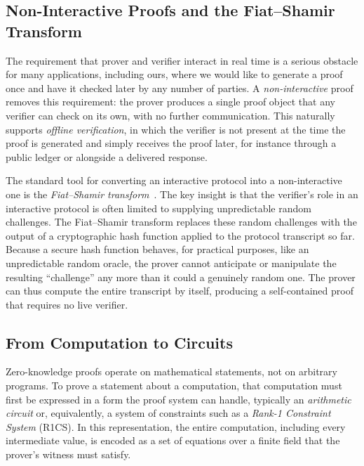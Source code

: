 \subsection{Non-Interactive Proofs and the Fiat--Shamir Transform}
\label{subsec:bg-noninteractive}

The requirement that prover and verifier interact in real time is a serious obstacle for many applications, including ours, where we would like to generate a proof once and have it checked later by any number of parties. A \emph{non-interactive} proof removes this requirement: the prover produces a single proof object that any verifier can check on its own, with no further communication. This naturally supports \emph{offline verification}, in which the verifier is not present at the time the proof is generated and simply receives the proof later, for instance through a public ledger or alongside a delivered response.

\medskip

The standard tool for converting an interactive protocol into a non-interactive one is the \emph{Fiat--Shamir transform}~\cite{fiat1986how}. The key insight is that the verifier's role in an interactive protocol is often limited to supplying unpredictable random challenges. The Fiat--Shamir transform replaces these random challenges with the output of a cryptographic hash function applied to the protocol transcript so far. Because a secure hash function behaves, for practical purposes, like an unpredictable random oracle, the prover cannot anticipate or manipulate the resulting ``challenge'' any more than it could a genuinely random one. The prover can thus compute the entire transcript by itself, producing a self-contained proof that requires no live verifier.

\subsection{From Computation to Circuits}
\label{subsec:bg-circuits}

Zero-knowledge proofs operate on mathematical statements, not on arbitrary programs. To prove a statement about a computation, that computation must first be expressed in a form the proof system can handle, typically an \emph{arithmetic circuit} or, equivalently, a system of constraints such as a \emph{Rank-1 Constraint System} (R1CS). In this representation, the entire computation, including every intermediate value, is encoded as a set of equations over a finite field that the prover's witness must satisfy.

